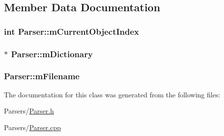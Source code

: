 \subsection{Member Data Documentation}
\subsubsection[{\texorpdfstring{m\+Current\+Object\+Index}{mCurrentObjectIndex}}]{\setlength{\rightskip}{0pt plus 5cm}int Parser\+::m\+Current\+Object\+Index\hspace{0.3cm}{\ttfamily [private]}}\hypertarget{classParser_a0e3580b63a2f778a137f1708bc8e12b4}{}\label{classParser_a0e3580b63a2f778a137f1708bc8e12b4}
\subsubsection[{\texorpdfstring{m\+Dictionary}{mDictionary}}]{$\ast$ Parser\+::m\+Dictionary\hspace{0.3cm}{\ttfamily [protected]}}\hypertarget{classParser_a5325951c7bcc206bcf0d4d2c573b7366}{}\label{classParser_a5325951c7bcc206bcf0d4d2c573b7366}
\subsubsection[{\texorpdfstring{m\+Filename}{mFilename}}]{ Parser\+::m\+Filename\hspace{0.3cm}{\ttfamily [private]}}\hypertarget{classParser_a2df037b8d7a6216b4fc88c17408c30e3}{}\label{classParser_a2df037b8d7a6216b4fc88c17408c30e3}


The documentation for this class was generated from the following files\+:\begin{DoxyCompactItemize}
\item 
Parsers/\hyperlink{Parser_8h}{Parser.\+h}\item 
Parsers/\hyperlink{Parser_8cpp}{Parser.\+cpp}\end{DoxyCompactItemize}

